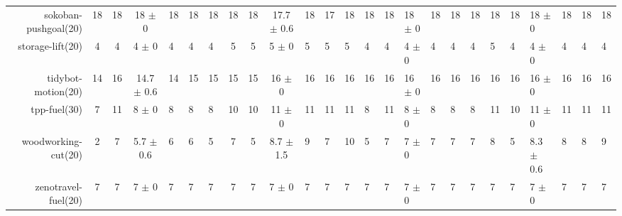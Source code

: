 \begin{center}
\begin{tabular}{|r|cccHHH|cccHHHHHHHHHHHHHHH|}
sokoban-pushgoal(20) & 18 & 18 & 18 $\pm$ 0 & 18 & 18 & 18 & 18 & 18 & 17.7 $\pm$ 0.6 & 18 & 17 & 18 & 18 & 18 & 18 $\pm$ 0 & 18 & 18 & 18 & 18 & 18 & 18 $\pm$ 0 & 18 & 18 & 18\\
storage-lift(20) & 4 & 4 & 4 $\pm$ 0 & 4 & 4 & 4 & 5 & 5 & 5 $\pm$ 0 & 5 & 5 & 5 & 4 & 4 & 4 $\pm$ 0 & 4 & 4 & 4 & 5 & 4 & 4 $\pm$ 0 & 4 & 4 & 4\\
tidybot-motion(20) & 14 & 16 & 14.7 $\pm$ 0.6 & 14 & 15 & 15 & 15 & 15 & 16 $\pm$ 0 & 16 & 16 & 16 & 16 & 16 & 16 $\pm$ 0 & 16 & 16 & 16 & 16 & 16 & 16 $\pm$ 0 & 16 & 16 & 16\\
tpp-fuel(30) & 7 & 11 & 8 $\pm$ 0 & 8 & 8 & 8 & 10 & 10 & 11 $\pm$ 0 & 11 & 11 & 11 & 8 & 11 & 8 $\pm$ 0 & 8 & 8 & 8 & 11 & 10 & 11 $\pm$ 0 & 11 & 11 & 11\\
woodworking-cut(20) & 2 & 7 & 5.7 $\pm$ 0.6 & 6 & 6 & 5 & 7 & 5 & 8.7 $\pm$ 1.5 & 9 & 7 & 10 & 5 & 7 & 7 $\pm$ 0 & 7 & 7 & 7 & 8 & 5 & 8.3 $\pm$ 0.6 & 8 & 8 & 9\\
zenotravel-fuel(20) & 7 & 7 & 7 $\pm$ 0 & 7 & 7 & 7 & 7 & 7 & 7 $\pm$ 0 & 7 & 7 & 7 & 7 & 7 & 7 $\pm$ 0 & 7 & 7 & 7 & 7 & 7 & 7 $\pm$ 0 & 7 & 7 & 7\\
\end{tabular}
\end{center}
